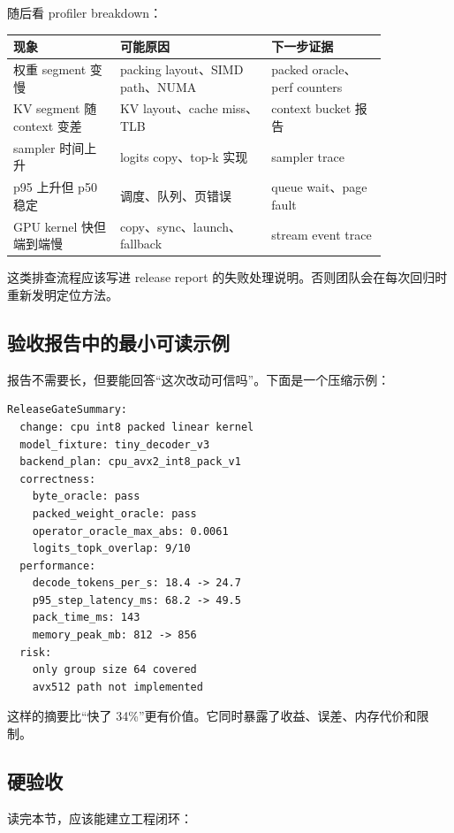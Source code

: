 随后看 profiler breakdown：

\begin{center}
\begin{tabular}{p{0.24\linewidth}p{0.34\linewidth}p{0.26\linewidth}}
\toprule
现象 & 可能原因 & 下一步证据 \\
\midrule
权重 segment 变慢 & packing layout、SIMD path、NUMA & packed oracle、perf counters \\
KV segment 随 context 变差 & KV layout、cache miss、TLB & context bucket 报告 \\
sampler 时间上升 & logits copy、top-k 实现 & sampler trace \\
p95 上升但 p50 稳定 & 调度、队列、页错误 & queue wait、page fault \\
GPU kernel 快但端到端慢 & copy、sync、launch、fallback & stream event trace \\
\bottomrule
\end{tabular}
\end{center}

这类排查流程应该写进 release report 的失败处理说明。否则团队会在每次回归时重新发明定位方法。

\subsection{验收报告中的最小可读示例}

报告不需要长，但要能回答“这次改动可信吗”。下面是一个压缩示例：

\begin{lstlisting}[numbers=none,caption={release gate 摘要示例}]
ReleaseGateSummary:
  change: cpu int8 packed linear kernel
  model_fixture: tiny_decoder_v3
  backend_plan: cpu_avx2_int8_pack_v1
  correctness:
    byte_oracle: pass
    packed_weight_oracle: pass
    operator_oracle_max_abs: 0.0061
    logits_topk_overlap: 9/10
  performance:
    decode_tokens_per_s: 18.4 -> 24.7
    p95_step_latency_ms: 68.2 -> 49.5
    pack_time_ms: 143
    memory_peak_mb: 812 -> 856
  risk:
    only group size 64 covered
    avx512 path not implemented
\end{lstlisting}

这样的摘要比“快了 34\%”更有价值。它同时暴露了收益、误差、内存代价和限制。

\subsection{硬验收}

读完本节，应该能建立工程闭环：

